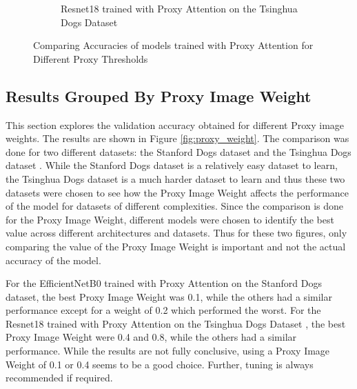 \documentclass[a4paper,11pt,openright]{book}
\begin{document}
\begin{figure}[!htb]
\begin{subfigure}[h]{.5\textwidth}
        \caption{Resnet18 \cite{heDeepResidualLearning2016} trained with Proxy Attention on the Tsinghua Dogs Dataset \cite{zouNewDatasetDog2020}}
    \end{subfigure}
    
    \caption{Comparing Accuracies of models trained with Proxy Attention for Different Proxy Thresholds}
    \label{fig:proxy_threshold}
\end{figure}

\subsection{Results Grouped By Proxy Image Weight}
This section explores the validation accuracy obtained for different Proxy image weights. The results are shown in Figure \ref{fig:proxy_weight}. 
The comparison was done for two different datasets: the Stanford Dogs dataset \cite{khoslaNovelDatasetFineGrained} and the Tsinghua Dogs dataset \cite{zouNewDatasetDog2020}. While the Stanford Dogs dataset is a relatively easy dataset to learn, the Tsinghua Dogs dataset is a much harder dataset to learn and thus these two datasets were chosen to see how the Proxy Image Weight affects the performance of the model for datasets of different complexities. Since the comparison is done for the Proxy Image Weight, different models were chosen to identify the best value across different architectures and datasets. Thus for these two figures, only comparing the value of the Proxy Image Weight is important and not the actual accuracy of the model.

For the EfficientNetB0 \cite{tanEfficientnetRethinkingModel2019} trained with Proxy Attention on the Stanford Dogs dataset\cite{khoslaNovelDatasetFineGrained}, the best Proxy Image Weight was 0.1, while the others had a similar performance except for a weight of 0.2 which performed the worst. For the Resnet18 \cite{heDeepResidualLearning2016} trained with Proxy Attention on the Tsinghua Dogs Dataset \cite{zouNewDatasetDog2020}, the best Proxy Image Weight were 0.4 and 0.8, while the others had a similar performance.
While the results are not fully conclusive, using a Proxy Image Weight of 0.1 or 0.4 seems to be a good choice. Further, tuning is always recommended if required.
\end{document}
